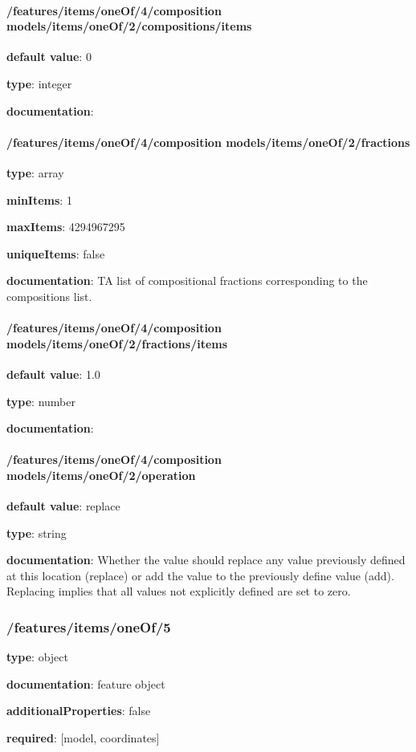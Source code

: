 \begin{itemized}
\paragraph{/features/items/oneOf/4/composition models/items/oneOf/2/compositions/items} \begin{itemized}
\item {\bf default value}: 0
\item {\bf type}: integer
\item {\bf documentation}: 
\end{itemized}\end{itemized}\paragraph{/features/items/oneOf/4/composition models/items/oneOf/2/fractions} \begin{itemized}
\item {\bf type}: array
\item {\bf minItems}: 1
\item {\bf maxItems}: 4294967295
\item {\bf uniqueItems}: false
\item {\bf documentation}: TA list of compositional fractions corresponding to the compositions list.
\paragraph{/features/items/oneOf/4/composition models/items/oneOf/2/fractions/items} \begin{itemized}
\item {\bf default value}: 1.0
\item {\bf type}: number
\item {\bf documentation}: 
\end{itemized}\end{itemized}\paragraph{/features/items/oneOf/4/composition models/items/oneOf/2/operation} \begin{itemized}
\item {\bf default value}: replace
\item {\bf type}: string
\item {\bf documentation}: Whether the value should replace any value previously defined at this location (replace) or add the value to the previously define value (add). Replacing implies that all values not explicitly defined are set to zero.
\end{itemized}\subsubsection{/features/items/oneOf/5} \begin{itemized}
\item {\bf type}: object
\item {\bf documentation}: feature object
\item {\bf additionalProperties}: false
\item {\bf required}: [model, coordinates]\end{itemized}
